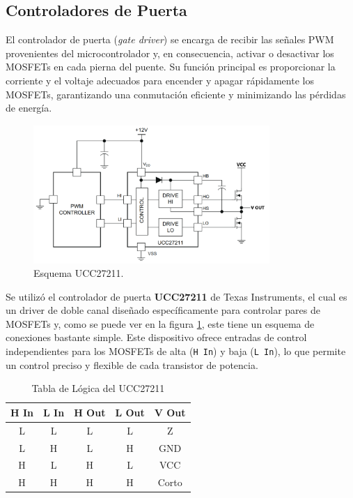 \documentclass[11pt]{report}
\begin{document}
\newpage
\subsection{Controladores de Puerta}

El controlador de puerta (\textit{gate driver}) se encarga de recibir las señales PWM provenientes del microcontrolador y, en consecuencia, activar o desactivar los MOSFETs en cada pierna del puente. Su función principal es proporcionar la corriente y el voltaje adecuados para encender y apagar rápidamente los MOSFETs, garantizando una conmutación eficiente y minimizando las pérdidas de energía.

\begin{figure}[ht]
	\centering
	\includegraphics[width=0.8\textwidth]{imagenes/Diagramas/UCC27211.png}
	\caption{Esquema UCC27211.}
	\label{UCC27211}
\end{figure}
\FloatBarrier

Se utilizó el controlador de puerta \textbf{UCC27211} de Texas Instruments, el cual es un driver de doble canal diseñado específicamente para controlar pares de MOSFETs y, como se puede ver en la figura \ref{UCC27211}, este tiene un esquema de conexiones bastante simple. Este dispositivo ofrece entradas de control independientes para los MOSFETs de alta (\texttt{H In}) y baja (\texttt{L In}), lo que permite un control preciso y flexible de cada transistor de potencia.

\begin{table}[ht]
	\centering
	\caption{Tabla de Lógica del UCC27211}
	\label{tab:device_logic}
	\begin{tabular}{|c|c|c|c|c|}
		\hline
		\textbf{H In} & \textbf{L In} & \textbf{H Out} & \textbf{L Out} & \textbf{V Out} \\ \hline
		L             & L             & L              & L              & Z              \\ \hline
		L             & H             & L              & H              & GND            \\ \hline
		H             & L             & H              & L              & VCC            \\ \hline
		H             & H             & H              & H              & Corto          \\ \hline
	\end{tabular}
\end{table}
\FloatBarrier
\end{document}
